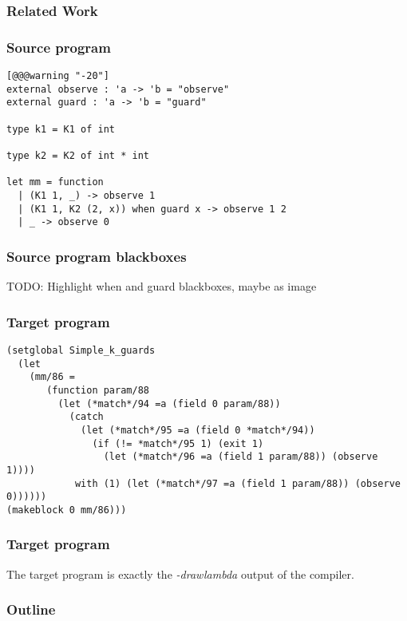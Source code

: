 \documentclass{beamer}
\begin{document}
\begin{frame}
  \frametitle{Related Work}
\end{frame}

\begin{frame}[fragile]
  \frametitle{Source program}
  \begin{lstlisting}
[@@@warning "-20"]
external observe : 'a -> 'b = "observe"
external guard : 'a -> 'b = "guard"

type k1 = K1 of int

type k2 = K2 of int * int

let mm = function
  | (K1 1, _) -> observe 1
  | (K1 1, K2 (2, x)) when guard x -> observe 1 2
  | _ -> observe 0

\end{lstlisting}
\end{frame}
\begin{frame}[fragile]
  \frametitle{Source program blackboxes}
  TODO: Highlight when and guard blackboxes, maybe as image
\end{frame}

\begin{frame}[fragile]
  \frametitle{Target program}
\begin{lstlisting}
(setglobal Simple_k_guards
  (let
    (mm/86 =
       (function param/88
         (let (*match*/94 =a (field 0 param/88))
           (catch
             (let (*match*/95 =a (field 0 *match*/94))
               (if (!= *match*/95 1) (exit 1)
                 (let (*match*/96 =a (field 1 param/88)) (observe 1))))
            with (1) (let (*match*/97 =a (field 1 param/88)) (observe 0))))))
(makeblock 0 mm/86)))
\end{lstlisting}
\end{frame}

\begin{frame}[fragile]
  \frametitle{Target program}
  The target program is exactly the \emph{-drawlambda} output of the compiler.
\end{frame}

\begin{frame}
  \frametitle{Outline}
  \tableofcontents
\end{frame}
\end{document}
